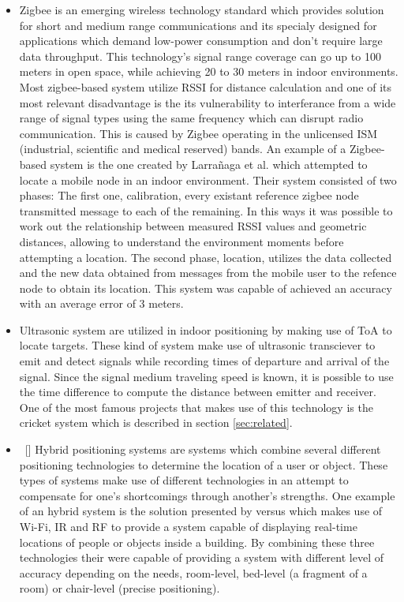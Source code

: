\begin{itemize}
\item [] Zigbee is an emerging wireless technology standard which provides solution for short and medium range communications and its specialy designed for applications which demand low-power consumption and don't require large data throughput. This technology's signal range coverage can go up to 100 meters in open space, while achieving 20 to 30 meters in indoor environments. Most zigbee-based system utilize \ac{RSSI} for distance calculation and one of its most relevant disadvantage is the its vulnerability to interferance from a wide range of signal types using the same frequency which can disrupt radio communication. This is caused by Zigbee operating in the unlicensed ISM (industrial, scientific and medical reserved) bands. An example of a Zigbee-based system is the one created by Larrañaga et al. \cite{zigbee} which attempted to locate a mobile node in an indoor environment. Their system consisted of two phases: The first one, calibration, every existant reference zigbee node transmitted message to each of the remaining. In this ways it was possible to work out the relationship between measured \ac{RSSI} values and geometric distances, allowing to understand the environment moments before attempting a location. The second phase, location, utilizes the data collected and the new data obtained from messages from the mobile user to the refence node to obtain its location. This system was capable of achieved an accuracy with an average error of 3 meters.  


\item [] Ultrasonic system are utilized in indoor positioning by making use of \ac{ToA} to locate targets. These kind of system make use of ultrasonic transciever to emit and detect signals while recording times of departure and arrival of the signal. Since the signal medium traveling speed is known, it is possible to use the time difference to compute the distance between emitter and receiver.  One of the most famous projects that makes use of this technology is the cricket system which is described in section \ref{sec:related}.


\item [] Hybrid positioning systems are systems which combine several different positioning technologies to determine the location of a user or object. These types of systems make use of different technologies in an attempt to compensate for one's shortcomings through another's strengths. One example of an hybrid system is the solution presented by versus \cite{versus} which makes use of Wi-Fi, IR and RF to provide a system capable of displaying real-time locations of people or objects inside a building. By combining these three technologies their were capable of providing a system with different level of accuracy depending on the needs, room-level, bed-level (a fragment of a room) or chair-level (precise positioning). 

\end{itemize}
